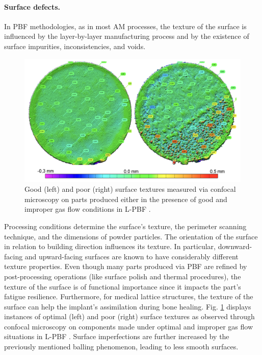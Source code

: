 \paragraph{Surface defects.} In PBF methodologies, as in most AM processes, the texture of the surface is influenced by the layer-by-layer manufacturing process and by the existence of surface impurities, inconsistencies, and voids.
\begin{figure}
    \centering
    \includegraphics[scale=0.4]{Images/surface.png}
    \caption[Surface roughness in PBF]{Good (left) and poor (right) surface textures measured via confocal microscopy on parts produced either in the presence of good and improper gas flow conditions in L-PBF \cite{ladewig_influence_2016}.}
    \label{fig:surface}
\end{figure}
Processing conditions determine the surface's texture, the perimeter scanning technique, and the dimensions of powder particles. The orientation of the surface in relation to building direction influences its texture. In particular, downward-facing and upward-facing surfaces are known to have considerably different texture properties. Even though many parts produced via PBF are refined by post-processing operations (like surface polish and thermal procedures), the texture of the surface is of functional importance since it impacts the part's fatigue resilience. Furthermore, for medical lattice structures, the texture of the surface can help the implant's assimilation during bone healing. Fig. \ref{fig:surface} displays instances of optimal (left) and poor (right) surface textures as observed through confocal microscopy on components made under optimal and improper gas flow situations in L-PBF \cite{ladewig_influence_2016}. Surface imperfections are further increased by the previously mentioned balling phenomenon, leading to less smooth surfaces.
